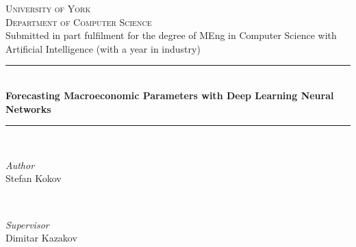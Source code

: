 
\begin{titlepage} %
	\newcommand{\HRule}{\rule{\linewidth}{0.5mm}} %
	

	
	\center %


	
	\textsc{\LARGE University of York}\\[0.2cm] %
	
	\textsc{\Large Department of Computer Science}\\[3.0cm] %
	
	\large Submitted in part fulfilment for the degree of MEng in Computer Science with Artificial Intelligence (with a year in industry)\\[0.5cm] %
	
	
	\HRule\\[0.4cm]
	
	{\huge\bfseries Forecasting Macroeconomic Parameters with Deep Learning Neural Networks}\\[0.4cm] %
	
	\HRule\\[1.5cm]
	
	
	\begin{minipage}{0.4\textwidth}
		\begin{flushleft}
			\large
			\textit{Author}\\
			Stefan Kokov %
		\end{flushleft}
	\end{minipage}
	~
	\begin{minipage}{0.4\textwidth}
		\begin{flushright}
			\large
			\textit{Supervisor}\\
			Dimitar Kazakov %
		\end{flushright}
	\end{minipage}
	

\end{titlepage}
